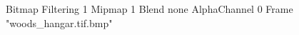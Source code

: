 {Bitmap
	{Filtering 1}
	{Mipmap 1}
	{Blend none}
	{AlphaChannel 0}
	{Frame "woods_hangar.tif.bmp"}
}
